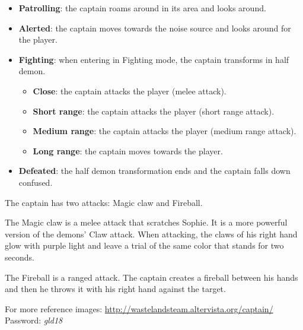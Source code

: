\begin{itemize}
	\item \textbf{Patrolling}: the captain roams around in its area and looks around.
	\item \textbf{Alerted}: the captain moves towards the noise source and looks around for the player.
	\item \textbf{Fighting}: when entering in Fighting mode, the captain transforms in half demon.
	\begin{itemize}
		\item \textbf{Close}: the captain attacks the player (melee attack).
		\item \textbf{Short range}: the captain attacks the player (short range attack).
		\item \textbf{Medium range}: the captain attacks the player (medium range attack).
		\item \textbf{Long range}: the captain moves towards the player.
	\end{itemize}
	\item \textbf{Defeated}: the half demon transformation ends and the captain falls down confused.
\end{itemize}

The captain has two attacks: Magic claw and Fireball.

The Magic claw is a melee attack that scratches Sophie. It is a more powerful version of the demons' Claw attack. When attacking, the claws of his right hand glow with purple light and leave a trial of the same color that stands for two seconds.

The Fireball is a ranged attack. The captain creates a fireball between his hands and then he throws it with his right hand against the target.

For more reference images: \url{http://wastelandsteam.altervista.org/captain/}\\
Password: \textit{gld18}
